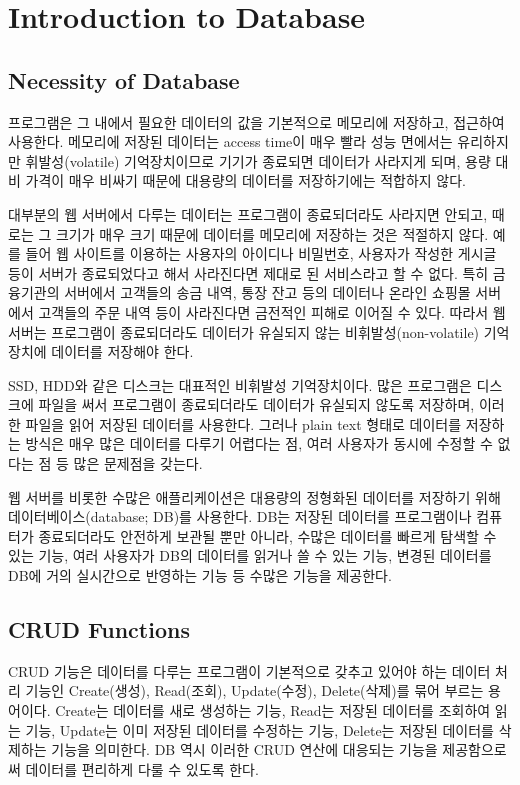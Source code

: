 \section{Introduction to Database}\label{sect:intro-to-database}

\subsection*{Necessity of Database}

프로그램은 그 내에서 필요한 데이터의 값을 기본적으로 메모리에 저장하고, 접근하여 사용한다. 메모리에 저장된 데이터는 access time이 매우 빨라 성능 면에서는 유리하지만 휘발성(volatile) 기억장치이므로 기기가 종료되면 데이터가 사라지게 되며, 용량 대비 가격이 매우 비싸기 때문에 대용량의 데이터를 저장하기에는 적합하지 않다.

대부분의 웹 서버에서 다루는 데이터는 프로그램이 종료되더라도 사라지면 안되고, 때로는 그 크기가 매우 크기 때문에 데이터를 메모리에 저장하는 것은 적절하지 않다. 예를 들어 웹 사이트를 이용하는 사용자의 아이디나 비밀번호, 사용자가 작성한 게시글 등이 서버가 종료되었다고 해서 사라진다면 제대로 된 서비스라고 할 수 없다. 특히 금융기관의 서버에서 고객들의 송금 내역, 통장 잔고 등의 데이터나 온라인 쇼핑몰 서버에서 고객들의 주문 내역 등이 사라진다면 금전적인 피해로 이어질 수 있다. 따라서 웹 서버는 프로그램이 종료되더라도 데이터가 유실되지 않는 비휘발성(non-volatile) 기억장치에 데이터를 저장해야 한다.

SSD, HDD와 같은 디스크는 대표적인 비휘발성 기억장치이다. 많은 프로그램은 디스크에 파일을 써서 프로그램이 종료되더라도 데이터가 유실되지 않도록 저장하며, 이러한 파일을 읽어 저장된 데이터를 사용한다. 그러나 plain text 형태로 데이터를 저장하는 방식은 매우 많은 데이터를 다루기 어렵다는 점, 여러 사용자가 동시에 수정할 수 없다는 점 등 많은 문제점을 갖는다.

웹 서버를 비롯한 수많은 애플리케이션은 대용량의 정형화된 데이터를 저장하기 위해 데이터베이스(database; DB)를 사용한다. DB는 저장된 데이터를 프로그램이나 컴퓨터가 종료되더라도 안전하게 보관될 뿐만 아니라, 수많은 데이터를 빠르게 탐색할 수 있는 기능, 여러 사용자가 DB의 데이터를 읽거나 쓸 수 있는 기능, 변경된 데이터를 DB에 거의 실시간으로 반영하는 기능 등 수많은 기능을 제공한다.

\subsection*{CRUD Functions}

CRUD 기능은 데이터를 다루는 프로그램이 기본적으로 갖추고 있어야 하는 데이터 처리 기능인 Create(생성), Read(조회), Update(수정), Delete(삭제)를 묶어 부르는 용어이다. Create는 데이터를 새로 생성하는 기능, Read는 저장된 데이터를 조회하여 읽는 기능, Update는 이미 저장된 데이터를 수정하는 기능, Delete는 저장된 데이터를 삭제하는 기능을 의미한다. DB 역시 이러한 CRUD 연산에 대응되는 기능을 제공함으로써 데이터를 편리하게 다룰 수 있도록 한다.

